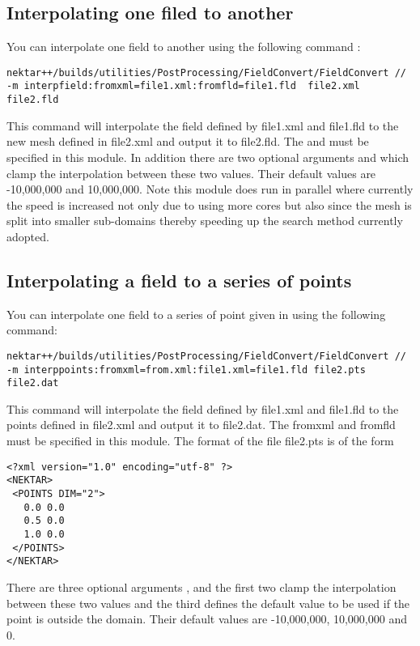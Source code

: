 \subsection{Interpolating one filed to another}
You can interpolate one field to another using the following command  :
\begin{lstlisting}[style=BashInputStyle]
nektar++/builds/utilities/PostProcessing/FieldConvert/FieldConvert //
-m interpfield:fromxml=file1.xml:fromfld=file1.fld  file2.xml file2.fld
\end{lstlisting}
This command will interpolate the field defined by file1.xml and file1.fld to the new mesh defined in file2.xml and output it to file2.fld. The  and  must be specified in this module. In addition there are two optional arguments  and  which clamp the interpolation between these two values. Their default values are -10,000,000 and 10,000,000.
Note this module does run in parallel where currently the speed is increased not only due to using more cores but also since the mesh is split into smaller sub-domains thereby speeding up the search method currently adopted.
\subsection{Interpolating a field to a series of points}
You can interpolate one field to a series of point given in using the following command:
\begin{lstlisting}[style=BashInputStyle]
nektar++/builds/utilities/PostProcessing/FieldConvert/FieldConvert //
-m interppoints:fromxml=from.xml:file1.xml=file1.fld file2.pts file2.dat
\end{lstlisting}
This command will interpolate the field defined by file1.xml and file1.fld to the points defined in file2.xml and output it to file2.dat. The fromxml and fromfld must be specified in this module. The format of the file file2.pts is of the form
\begin{lstlisting}[style=BashInputStyle]
<?xml version="1.0" encoding="utf-8" ?>
<NEKTAR>
 <POINTS DIM="2">
   0.0 0.0
   0.5 0.0 
   1.0 0.0 
 </POINTS>
</NEKTAR>
\end{lstlisting}
There are three optional arguments ,  and  the first two clamp the interpolation between these two values and the third defines the default value to be used if the point is outside the domain. Their default values are -10,000,000, 10,000,000 and 0.

